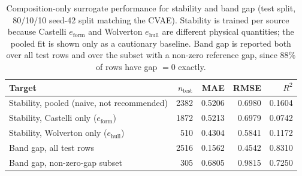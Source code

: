 \begin{table}[t]
\centering
\caption{Composition-only surrogate performance for stability and band gap (test split, 80/10/10 seed-42 split matching the CVAE). Stability is trained per source because Castelli $e_{\mathrm{form}}$ and Wolverton $e_{\mathrm{hull}}$ are different physical quantities; the pooled fit is shown only as a cautionary baseline. Band gap is reported both over all test rows and over the subset with a non-zero reference gap, since 88\% of rows have gap $=0$ exactly.}
\label{tab:a5_stability_gap}
\begin{tabular}{lrrrr}
\toprule
Target & $n_{\mathrm{test}}$ & MAE & RMSE & $R^2$ \\
\midrule
Stability, pooled (naive, not recommended) & 2382 & 0.5206 & 0.6980 & 0.1604 \\
Stability, Castelli only ($e_{\mathrm{form}}$) & 1872 & 0.5213 & 0.6979 & 0.0742 \\
Stability, Wolverton only ($e_{\mathrm{hull}}$) & 510 & 0.4304 & 0.5841 & 0.1172 \\
\midrule
Band gap, all test rows & 2516 & 0.1562 & 0.4542 & 0.8310 \\
Band gap, non-zero-gap subset & 305 & 0.6805 & 0.9815 & 0.7250 \\
\bottomrule
\end{tabular}
\end{table}
